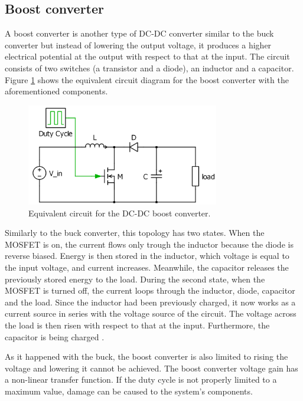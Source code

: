 
\subsection{Boost converter\label{Boost-C}}

A boost converter is another type of DC-DC converter similar to the buck converter but instead of lowering the output voltage, it produces a higher electrical potential at the output with respect to that at the input. 
The circuit consists of two switches (a transistor and a diode), an inductor and a capacitor. Figure \ref{Boost-converter} shows the equivalent circuit diagram for the boost converter with the aforementioned components. %

\begin{figure}[H]
	\begin{center}
		\includegraphics[width=0.75\textwidth]{../Pictures/Boost-converter}
		\caption{Equivalent circuit for the DC-DC boost converter.}
		\label{Boost-converter}
	\end{center}	
\end{figure}


Similarly to the buck converter, this topology has two states. When the MOSFET is on, the current flows only trough the inductor because the diode  is reverse biased. Energy is then stored in the inductor, which voltage is equal to the input voltage, and current increases. Meanwhile, the capacitor releases the previously stored energy to the load.
During the second state, when the MOSFET is turned off, the current loops through the inductor, diode, capacitor and the load. Since the inductor had been previously charged, it now works as a current source in series with the voltage source of the circuit. The voltage across the load is then risen with respect to that at the input. Furthermore, the capacitor is being charged \cite{schematicbuckandboost}. 

As it happened with the buck, the boost converter is also limited to rising the voltage and lowering it cannot be achieved. The boost converter voltage gain has a non-linear transfer function.  If the duty cycle is not properly limited to a maximum value, damage can be caused to the system's components. \cite{advantagebuckboost}
 
